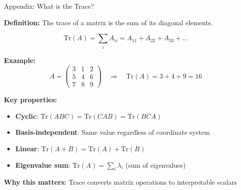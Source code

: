 \documentclass[aspectratio=169,11pt]{beamer}
\begin{document}
\begin{frame}{Appendix: What is the Trace?}

\textbf{Definition:} The trace of a matrix is the sum of its diagonal elements.

$$\text{Tr}(A) = \sum_{i} A_{ii} = A_{11} + A_{22} + A_{33} + \ldots$$

\vspace{0.5em}

\textbf{Example:}
$$A = \begin{pmatrix} 3 & 1 & 2 \\ 5 & 4 & 6 \\ 7 & 8 & 9 \end{pmatrix} \quad \Rightarrow \quad \text{Tr}(A) = 3 + 4 + 9 = 16$$

\vspace{0.5em}

\textbf{Key properties:}
\begin{itemize}
  \item \textbf{Cyclic}: $\text{Tr}(ABC) = \text{Tr}(CAB) = \text{Tr}(BCA)$
  \item \textbf{Basis-independent}: Same value regardless of coordinate system
  \item \textbf{Linear}: $\text{Tr}(A + B) = \text{Tr}(A) + \text{Tr}(B)$
  \item \textbf{Eigenvalue sum}: $\text{Tr}(A) = \sum_i \lambda_i$ (sum of eigenvalues)
\end{itemize}

\vspace{0.5em}

\textbf{Why this matters:} Trace converts matrix operations to interpretable scalars

\end{frame}
\end{document}
